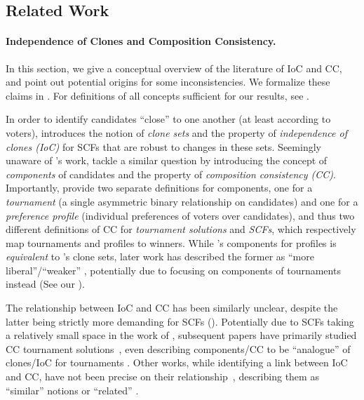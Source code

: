 \subsection{Related Work}\label{sec:related}


\paragraph{Independence of Clones and Composition Consistency.} In this section, we give a conceptual overview of the literature of IoC and CC, and point out potential origins for some inconsistencies. We formalize these claims in . For definitions of all concepts sufficient for our results, see .  

In order to identify candidates ``close'' to one another (at least according to voters), \citet{Tideman87:Independence} introduces the notion of \emph{clone sets} and the property of \emph{independence of clones (IoC)} for SCFs that are robust to changes in these sets. Seemingly unaware of \citeauthor{Tideman87:Independence}'s work, \citet{Laffond96:Composition} tackle a similar question by introducing the concept of \emph{components} of candidates and the property of \emph{composition consistency (CC)}. Importantly, \citeauthor{Laffond96:Composition} provide two separate definitions for components, one for a \emph{tournament} (a single asymmetric binary relationship on candidates) and one for a \emph{preference profile} (individual preferences of voters over candidates), and thus two different definitions of CC for \emph{tournament solutions} and \emph{SCFs}, which respectively map tournaments and profiles to winners. While \citeauthor{Laffond96:Composition}'s components for profiles is \emph{equivalent} to \citeauthor{Tideman87:Independence}'s clone sets, later work has described the former as ``more liberal''/``weaker'' \citep{Conitzer24:Position,Holliday24:Simple}, potentially due to focusing on components of tournaments instead (See our ).

The relationship between IoC and CC has been similarly unclear, despite the latter being strictly more demanding for SCFs (). Potentially due to SCFs taking a relatively small space in the work of \citet{Laffond96:Composition}, subsequent papers have primarily studied CC tournament solutions~\citep{Laslier97:Tournament,Brandt11:Fixed,Brandt18:Extending}, even describing components/CC to be ``analogue'' of clones/IoC for tournaments \citep{Elkind11:Cloning,Dellis13:Multiple,Karpov22:Symmetric}. Other works, while identifying a link between IoC and CC, have not been precise on their relationship~\citep{Brandt09:Some,Öztürk20:Consistency,Koray07:Self,Laslier12:Loser,Lederer24:Bivariate,Saitoh22:Characterization,Elkind17:What,Camps12:Continuous,Laslier16:Strategic}, describing them as ``similar'' notions \citep{Laslier97:Tournament,Heitzig10:Some} or ``related'' \citep{Brandt11:Fixed}.

